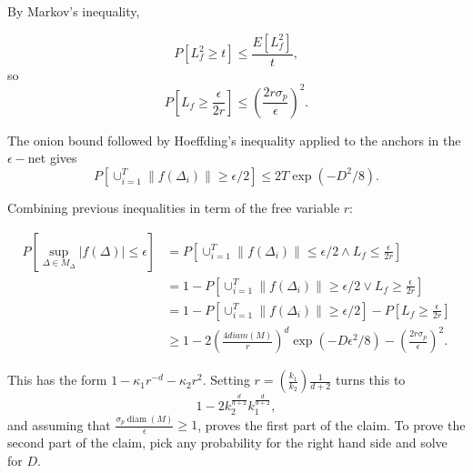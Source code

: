 \begin{frame}
By Markov's inequality, 

\begin{equation}
    P \left[
        L_f^2 \geq t
    \right]
    \leq 
    \frac{E[L_f^2]}{t}, 
\end{equation}
so 
\begin{equation}
    P
    \left[
        L_f
        \geq 
        \frac{\epsilon}{2r}
    \right]
    \leq 
    \left(
        \frac{2 r \sigma_p}{\epsilon}
    \right)^2.
\end{equation}

The onion bound followed by Hoeffding's 
inequality applied to the anchors in the 
$\epsilon-$net gives 
\begin{equation}
    P\left[
       \cup^T_{i = 1} 
       \|f(\Delta_i)\| 
       \geq \epsilon / 2
    \right]
    \leq 2T
    \exp\left(-D^2/8\right).
\end{equation}

\end{frame}

\begin{frame}
Combining previous inequalities in term of the free variable $r$: 

\begin{align}
    P\left[
        \sup_{\Delta \in M_\Delta}
        |f(\Delta)| 
        \leq \epsilon
    \right]
    & =  
    P\left[
        \cup^T_{i = 1} 
       \|f(\Delta_i)\| 
       \leq \epsilon / 2
       \wedge
       L_f \leq \frac{\epsilon}{2 r}
    \right]
    \\ 
    & = 
    1 - 
    P\left[
        \cup^T_{i = 1} 
       \|f(\Delta_i)\| 
       \geq \epsilon / 2
       \vee
       L_f \geq \frac{\epsilon}{2 r}
    \right]
    \\ 
    & = 
    1 - 
    P\left[
        \cup^T_{i = 1} 
       \|f(\Delta_i)\| 
       \geq \epsilon / 2
       \right]
       - 
       P\left[
       L_f \geq \frac{\epsilon}{2 r}
    \right]
    \\ & 
    \geq 
    1 -2 \left(
        \frac{4 diam(M)}{r}
    \right)^d
    \exp(-D \epsilon^2/8)
    - \left(
        \frac{2 r \sigma_p}{\epsilon}
    \right)^2.
\end{align}

\end{frame}

\begin{frame}
This has the form $1-\kappa_1 r^{-d}-\kappa_2 r^2$. 
Setting
 $r=\left( \frac{k_1}{k_2}\right)\frac{1}{d+2}$ 
 turns this to
 \begin{equation}
    1 - 
    2 k_2^{\frac{d}{d+2}}
    k_1^{\frac{d}{d+2}}, 
 \end{equation}
and assuming that $\frac{\sigma_p \operatorname{diam}(M)}{\epsilon} \geq 1$, proves the first part of the claim. To prove the second part of the claim, pick any probability for the right hand side and solve for $D$.


  

\end{frame}